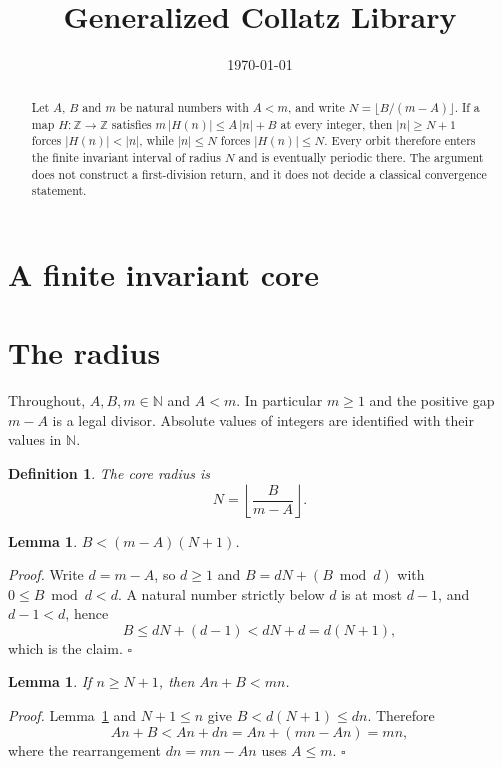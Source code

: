 \documentclass[11pt,letterpaper]{article}
\title{Generalized Collatz Library}
\author{}
\date{\today}
\newcommand{\N}{\mathbb{N}}
\newcommand{\Z}{\mathbb{Z}}
\newtheorem{lemma}[theorem]{Lemma}
\newtheorem{definition}[theorem]{Definition}
\newenvironment{proof}{\noindent\textit{Proof.}}{\hfill\(\square\)}
\begin{document}
\maketitle
\section*{A finite invariant core}

\begin{abstract}
Let \(A\), \(B\) and \(m\) be natural numbers with \(A<m\), and write
\(N=\lfloor B/(m-A)\rfloor\). If a map \(H\colon\Z\to\Z\) satisfies
\(m\,|H(n)|\le A\,|n|+B\) at every integer, then \(|n|\ge N+1\) forces
\(|H(n)|<|n|\), while \(|n|\le N\) forces \(|H(n)|\le N\). Every orbit
therefore enters the finite invariant interval of radius \(N\) and is
eventually periodic there. The argument does not construct a first-division
return, and it does not decide a classical convergence statement.
\end{abstract}

\section{The radius}

Throughout, \(A,B,m\in\N\) and \(A<m\). In particular \(m\ge1\) and the
positive gap \(m-A\) is a legal divisor. Absolute values of integers are
identified with their values in \(\N\).

\begin{definition}\label{Def:Radius}
The core radius is
\[
N=\left\lfloor\frac{B}{m-A}\right\rfloor .
\]
\end{definition}

\begin{lemma}\label{Lem:Room}
\(B<(m-A)(N+1)\).
\end{lemma}

\begin{proof}
Write \(d=m-A\), so \(d\ge1\) and \(B=dN+(B\bmod d)\) with
\(0\le B\bmod d<d\). A natural number strictly below \(d\) is at most
\(d-1\), and \(d-1<d\), hence
\[
B\le dN+(d-1)<dN+d=d(N+1),
\]
which is the claim.
\end{proof}

\begin{lemma}\label{Lem:Descent}
If \(n\ge N+1\), then \(A n+B<m n\).
\end{lemma}

\begin{proof}
Lemma~\ref{Lem:Room} and \(N+1\le n\) give
\(B<d(N+1)\le d n\). Therefore
\[
A n+B<A n+d n=A n+(m n-A n)=m n,
\]
where the rearrangement \(d n=m n-A n\) uses \(A\le m\).
\end{proof}
\end{document}
